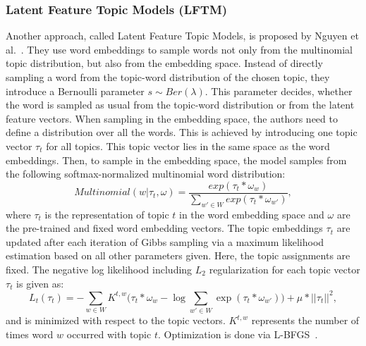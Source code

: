 \documentclass[
        a4paper,
        titlepage,
        twoside,
        parskip
        ]{scrbook}
\theoremstyle{break}
\begin{document}
\subsubsection{Latent Feature Topic Models (LFTM)}
Another approach, called Latent Feature Topic Models, is proposed by Nguyen et al.~\cite{Nguyen2015}.
They use word embeddings to sample words not only from the multinomial topic distribution, but also from the embedding space.
Instead of directly sampling a word from the topic-word distribution of the chosen topic, they introduce a Bernoulli parameter $s \sim Ber(\lambda)$.
This parameter decides, whether the word is sampled as usual from the topic-word distribution or from the latent feature vectors.
When sampling in the embedding space, the authors need to define a distribution over all the words.
This is achieved by introducing one topic vector $\tau_t$ for all topics.
This topic vector lies in the same space as the word embeddings.
Then, to sample in the embedding space, the model samples from the following softmax-normalized multinomial word distribution:
\begin{equation*}
    Multinomial(w | \tau_t, \omega) = \frac{exp(\tau_t * \omega_w)}{\sum_{w' \in W} exp(\tau_t * \omega_{w'})},
\end{equation*}
where $\tau_t$ is the representation of topic $t$ in the word embedding space and $\omega$ are the pre-trained and fixed word embedding vectors.
The topic embeddings $\tau_t$ are updated after each iteration of Gibbs sampling via a maximum likelihood estimation based on all other parameters given.
Here, the topic assignments are fixed.
The negative log likelihood including $L_2$ regularization for each topic vector $\tau_t$ is given as:
\begin{equation*}
  L_t(\tau_t) = - \sum_{w \in W} K^{t,w} \Big(\tau_t * \omega_w - \log \sum_{w' \in W} \exp (\tau_t * \omega_{w'}) \Big) + \mu * || \tau_t ||^2,
\end{equation*}
and is minimized with respect to the topic vectors.
$K^{t,w}$ represents the number of times word $w$ occurred with topic $t$.
Optimization is done via L-BFGS~\cite{Liu1989}.
\end{document}
